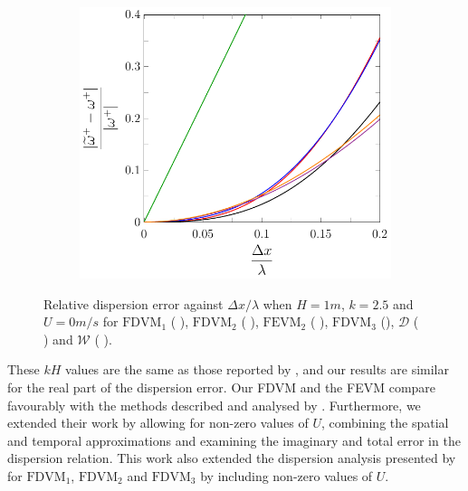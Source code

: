 \begin{figure}
\begin{subfigure}{0.5\textwidth}
	\end{subfigure}
	\par\bigskip
	\begin{subfigure}{0.5\textwidth}
		\includegraphics[width=\textwidth]{./chp4/figures/New/Dispu0Fill.pdf}
	\end{subfigure}
	\caption{Relative dispersion error against $\Delta x / \lambda$ when $H = 1m$, $k = 2.5$ and $U = 0m/s$ for $\text{FDVM}_1$ ({\color{green!60!black} \solidrule}), $\text{FDVM}_2$ ({\color{red} \solidrule}), $\text{FEVM}_2$ ({\color{blue} \solidrule}), $\text{FDVM}_3$ ({\solidrule}), $\mathcal{D}$ ({\color{violet!80!white} \solidrule}) and $\mathcal{W}$ ({\color{orange} \solidrule}).}
	\label{fig:Dispu0Fill}
\end{figure}

These $kH$ values are the same as those reported by \citet{Filippini-etal-2016-381}, and our results are similar for the real part of the dispersion error. Our FDVM and the FEVM compare favourably with the methods described and analysed by \citet{Filippini-etal-2016-381}. Furthermore, we extended their work by allowing for non-zero values of $U$, combining the spatial and temporal approximations and examining the imaginary and total error in the dispersion relation. This work also extended the dispersion analysis presented by \citet{Zoppou-etal-2017} for $\text{FDVM}_1$, $\text{FDVM}_2$ and $\text{FDVM}_3$ by including non-zero values of $U$.


